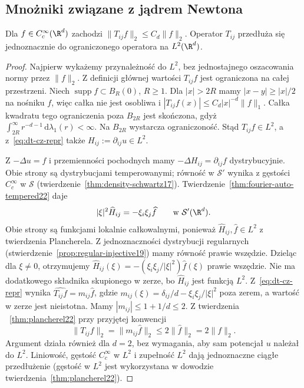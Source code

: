 \subsection{Mnożniki związane z jądrem Newtona}
\begin{lemat}[Oszacowanie w $L^2$]
\label{lem:dt-cz-l2}
Dla $f\in C_c^\infty(\R^d)$ zachodzi
$\|T_{ij}f\|_2\le C_d\|f\|_2$. Operator $T_{ij}$
przedłuża się jednoznacznie do ograniczonego operatora na
$L^2(\R^d)$.
\end{lemat}
\begin{proof}
Najpierw wykażemy przynależność do $L^2$, bez jednostajnego
oszacowania normy przez $\|f\|_2$. Z definicji głównej
wartości $T_{ij}f$ jest ograniczona na całej przestrzeni.
Niech $\operatorname{supp}f\subset B_R(0)$, $R\ge1$.
Dla $|x|>2R$ mamy $|x-y|\ge|x|/2$ na nośniku $f$,
więc całka nie jest osobliwa i
$|T_{ij}f(x)|\le C_d|x|^{-d}\|f\|_1$.
Całka kwadratu tego ograniczenia poza $B_{2R}$ jest
skończona, gdyż $\int_{2R}^\infty r^{-d-1}
\,\mathrm d\lambda_1(r)<\infty$.
Na $B_{2R}$ wystarcza ograniczoność. Stąd $T_{ij}f\in L^2$,
a z~\eqref{eq:dt-cz-repr} także $H_{ij}:=\partial_{ij}u\in L^2$.

Z $-\Delta u=f$ i przemienności pochodnych mamy
$-\Delta H_{ij}=\partial_{ij}f$ dystrybucyjnie.
Obie strony są dystrybucjami temperowanymi; równość
w $\mathcal S'$ wynika z gęstości $C_c^\infty$ w $\mathcal S$
(twierdzenie~\ref{thm:density-schwartz17}). Twierdzenie~\ref{thm:fourier-auto-tempered22} daje
\[
 |\xi|^2\widehat H_{ij}=-\xi_i\xi_j\widehat f
 \qquad\text{w }\mathcal S'(\R^d).
\]
Obie strony są funkcjami lokalnie całkowalnymi, ponieważ
$\widehat H_{ij},\widehat f\in L^2$ z twierdzenia
Plancherela. Z jednoznaczności dystrybucji regularnych
(stwierdzenie~\ref{prop:regular-injective19}) mamy równość
prawie wszędzie. Dzieląc dla $\xi\ne0$, otrzymujemy
$\widehat H_{ij}(\xi)=-(\xi_i\xi_j/|\xi|^2)\widehat f(\xi)$
prawie wszędzie. Nie ma dodatkowego składnika skupionego
w zerze, bo $\widehat H_{ij}$ jest funkcją $L^2$.
Z~\eqref{eq:dt-cz-repr} wynika
$\widehat{T_{ij}f}=m_{ij}\widehat f$, gdzie
$m_{ij}(\xi)=\delta_{ij}/d-\xi_i\xi_j/|\xi|^2$
poza zerem, a wartość w zerze jest nieistotna.
Mamy $|m_{ij}|\le1+1/d\le2$. Z twierdzenia
~\ref{thm:plancherel22} przy przyjętej konwencji
\[
 \|T_{ij}f\|_2=\|m_{ij}\widehat f\|_2
 \le 2\|\widehat f\|_2=2\|f\|_2.
\]
Argument działa również dla $d=2$, bez wymagania, aby
sam potencjał $u$ należał do $L^2$. Liniowość, gęstość
$C_c^\infty$ w $L^2$ i zupełność $L^2$ dają jednoznaczne
ciągłe przedłużenie (gęstość w $L^2$ jest wykorzystana w dowodzie
twierdzenia~\ref{thm:plancherel22}).
\end{proof}
